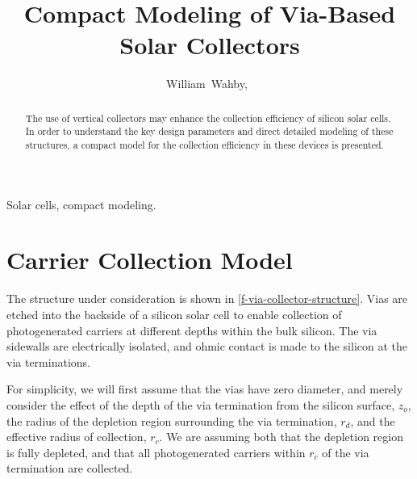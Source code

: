 \documentclass[journal,twoside]{IEEEtran}
\begin{document}

\title{Compact Modeling of Via-Based Solar Collectors}
\author{William~Wahby,~}


\maketitle



\begin{abstract}
The use of vertical collectors may enhance the collection efficiency of silicon solar cells.
In order to understand the key design parameters and direct detailed modeling of these structures,
a compact model for the collection efficiency in these devices is presented.
\end{abstract}

\begin{IEEEkeywords}
Solar cells, compact modeling.
\end{IEEEkeywords}

\section{Carrier Collection Model}
The structure under consideration is shown in \cref{f-via-collector-structure}. Vias are etched into the backside
of a silicon solar cell to enable collection of photogenerated carriers at different depths within the bulk silicon.
The via sidewalls are electrically isolated, and ohmic contact is made to the silicon at the via terminations.

For simplicity, we will first assume that the vias have zero diameter, and merely consider the effect of the
depth of the via termination from the silicon surface, $z_o$, the radius of the depletion region surrounding
the via termination, $r_d$, and the effective radius of collection, $r_c$. We are assuming both that the depletion
region is fully depleted, and that all photogenerated carriers within $r_c$ of the via termination are collected.
\end{document}
